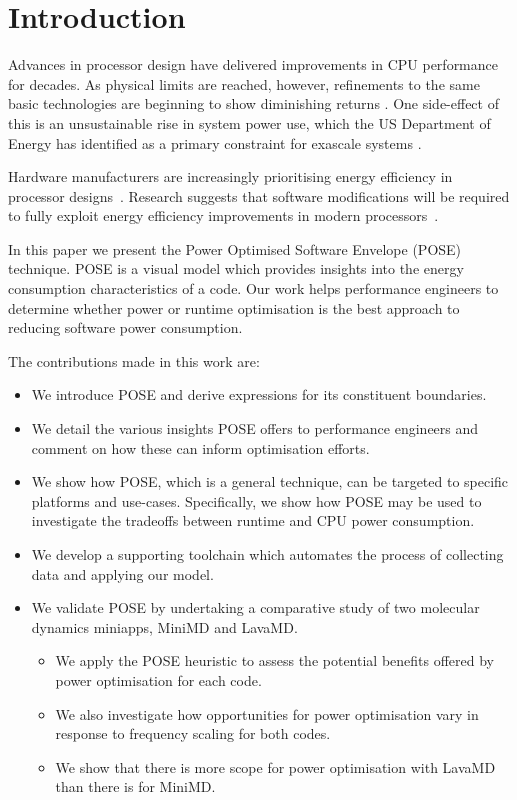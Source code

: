 \section{Introduction}
Advances in processor design have delivered improvements in CPU performance for decades. As physical limits are reached, however, refinements to the same basic technologies are beginning to show diminishing returns \cite{esmaeilzadeh:2011aa}. One side-effect of this is an unsustainable rise in system power use, which the US Department of Energy has identified as a primary constraint for exascale systems \cite{shalf:2011aa}.

Hardware manufacturers are increasingly prioritising energy efficiency in processor designs~\cite{kurd:2014aa}. 
Research suggests that software modifications will be required to fully exploit energy efficiency improvements in modern processors~\cite{shao:2013aa}. 

In this paper we present the Power Optimised Software Envelope (POSE) technique.
POSE is a visual model which provides insights into the energy consumption characteristics of a code.
Our work helps performance engineers to determine whether power or runtime optimisation is the best approach to reducing software power consumption.

\medskip \noindent
The contributions made in this work are:
\begin{itemize}
  \item We introduce POSE and derive expressions for its constituent boundaries.
  \item We detail the various insights POSE offers to performance engineers and comment on how these can inform optimisation efforts.
  \item We show how POSE, which is a general technique, can be targeted to specific platforms and use-cases. 
  Specifically, we show how POSE may be used to investigate the tradeoffs between runtime and CPU power consumption.
  \item We develop a supporting toolchain which automates the process of collecting data and applying our model. 
  \item We validate POSE by undertaking a comparative study of two molecular dynamics miniapps, MiniMD and LavaMD.
  \begin{itemize}
    \item We apply the POSE heuristic to assess the potential benefits offered by power optimisation for each code.
    \item We also investigate how opportunities for power optimisation vary in response to frequency scaling for both codes.
    \item We show that there is more scope for power optimisation with LavaMD than there is for MiniMD.
  \end{itemize}
\end{itemize}

